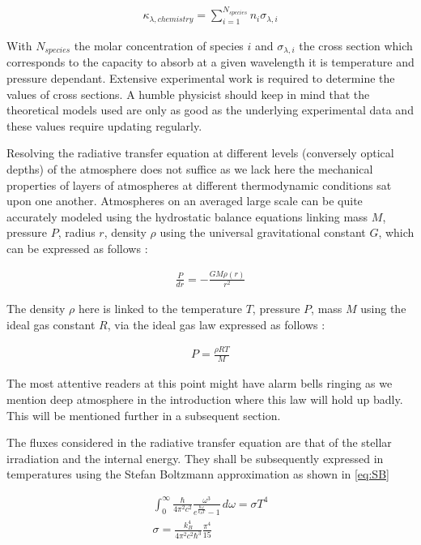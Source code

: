 \begin{align}
    \kappa_{\lambda, chemistry} = \sum_{i=1}^{N_{species}} n_{i} \sigma_{\lambda,i}
\end{align}

With $N_{species}$ the molar concentration of species $i$ and $\sigma_{\lambda,i}$ the cross section which corresponds to the capacity to absorb at a given wavelength it is temperature and pressure dependant. Extensive experimental work is required to determine the values of cross sections. A humble physicist should keep in mind that the theoretical models used are only as good as the underlying experimental data and these values require updating regularly.\par

Resolving the radiative transfer equation at different levels (conversely optical depths) of the atmosphere does not suffice as we lack here the mechanical properties of layers of atmospheres at different thermodynamic conditions sat upon one another. Atmospheres on an averaged large scale can be quite accurately modeled using the hydrostatic balance equations linking mass $M$, pressure $P$, radius $r$, density $\rho$ using the universal gravitational constant $G$, which can be expressed as follows : \par

\begin{align}
    \frac{P}{dr} = -\frac{GM\rho(r)}{r^{2}} \label{eq:HBE}
\end{align}

The density $\rho$ here is linked to the temperature $T$, pressure $P$, mass $M$ using the ideal gas constant $R$, via the ideal gas law expressed as follows :

\begin{align}
    P = \frac{\rho R T}{M} \label{eq:IG}
\end{align}


The most attentive readers at this point might have alarm bells ringing as we mention deep atmosphere in the introduction where this law will hold up badly. This will be mentioned further in a subsequent section.\par

The fluxes considered in the radiative transfer equation are that of the stellar irradiation and the internal energy. They shall be subsequently expressed in temperatures using the Stefan Boltzmann approximation as shown in \cref{eq:SB}

\begin{align}
    \int_{0}^{\infty} \frac{\hbar}{4\pi^2c^2}\frac{\omega^3}{e^{\frac{\hbar\omega}{k_B T}}-1}\, d\omega = \sigma T^4 \label{eq:SB} \\
    \sigma = \frac{k_B^4}{4\pi^2c^2\hbar^3}\frac{\pi^4}{15} \nonumber
\end{align}

